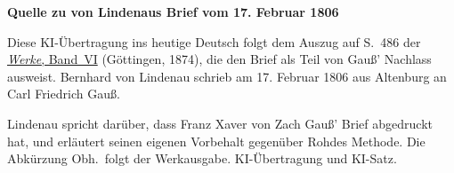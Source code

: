 \clearpage\thispagestyle{empty}
\begin{center}\textbf{Quelle zu von Lindenaus Brief vom 17. Februar 1806}\end{center}
\noindent Diese KI-Übertragung ins heutige Deutsch folgt dem Auszug auf S.~486 der \href{https://gdz.sub.uni-goettingen.de/id/PPN236007467}{\textit{Werke}, Band~VI} (Göttingen, 1874), die den Brief als Teil von Gauß’ Nachlass ausweist. Bernhard von Lindenau schrieb am 17. Februar 1806 aus Altenburg an Carl Friedrich Gauß.
\par\smallskip\noindent Lindenau spricht darüber, dass Franz Xaver von Zach Gauß’ Brief abgedruckt hat, und erläutert seinen eigenen Vorbehalt gegenüber Rohdes Methode. Die Abkürzung Obh.\ folgt der Werkausgabe. KI-Übertragung und KI-Satz.
\clearpage
